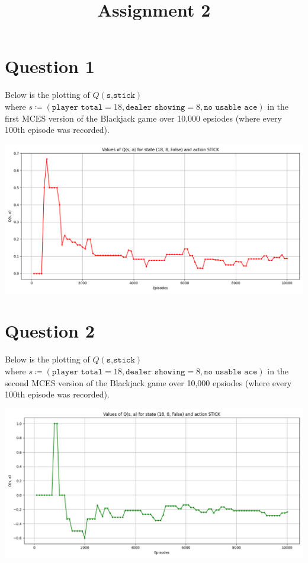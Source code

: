 \documentclass{article}
\title{Assignment 2}
\date{}
\author{}
\begin{document}
\maketitle
\section*{Question 1}
Below is the plotting of $Q(\texttt{s,stick})$\\ 
where $s\coloneq(\texttt{player total} = 18, \texttt{dealer showing} = 8, \texttt{no usable ace})$
in the first MCES version of the Blackjack game over 10,000 epsiodes (where every 100th episode was recorded).
\begin{center}
    \includegraphics[scale=0.5]{Q_values.png}
\end{center}
\section*{Question 2}
Below is the plotting of $Q(\texttt{s,stick})$\\ 
where $s\coloneq(\texttt{player total} = 18, \texttt{dealer showing} = 8, \texttt{no usable ace})$
in the second MCES version of the Blackjack game over 10,000 epsiodes (where every 100th episode was recorded).
\begin{center}
    \includegraphics[scale=0.5]{Q_values2.png}
\end{center}
\end{document}

